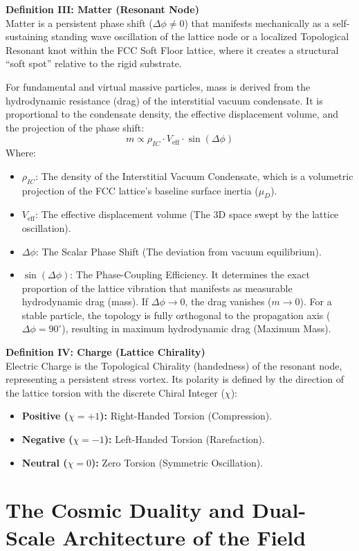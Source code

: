 \vspace{0.5em}
\noindent\textbf{Definition III: Matter (Resonant Node)}\\
Matter is a persistent phase shift ($\Delta\phi \neq 0$) that manifests mechanically as a self-sustaining standing wave oscillation of the lattice node or a localized Topological Resonant knot within the FCC Soft Floor lattice, where it creates a structural ``soft spot'' relative to the rigid substrate.

For fundamental and virtual massive particles, mass is derived from the hydrodynamic resistance (drag) of the interstitial vacuum condensate. It is proportional to the condensate density, the effective displacement volume, and the projection of the phase shift:
\begin{equation}
    m \propto \rho_{IC} \cdot V_{\text{eff}} \cdot \sin(\Delta\phi)
\end{equation}
Where:
\begin{itemize}
    \item $\rho_{IC}$: The density of the Interstitial Vacuum Condensate, which is a volumetric projection of the FCC lattice's baseline surface inertia ($\mu_D$).
    \item $V_{\text{eff}}$: The effective displacement volume (The 3D space swept by the lattice oscillation).
    \item $\Delta\phi$: The Scalar Phase Shift (The deviation from vacuum equilibrium).
    \item $\sin(\Delta\phi)$: The Phase-Coupling Efficiency. It determines the exact proportion of the lattice vibration that manifests as measurable hydrodynamic drag (mass). If $\Delta\phi \to 0$, the drag vanishes ($m \to 0$). For a stable particle, the topology is fully orthogonal to the propagation axis ($\Delta\phi = 90^\circ$), resulting in maximum hydrodynamic drag (Maximum Mass).
\end{itemize}

\vspace{0.5em}
\noindent\textbf{Definition IV: Charge (Lattice Chirality)}\\
Electric Charge is the Topological Chirality (handedness) of the resonant node, representing a persistent stress vortex. Its polarity is defined by the direction of the lattice torsion with the discrete Chiral Integer ($\chi$):
\begin{itemize}
    \item \textbf{Positive ($\chi = +1$):} Right-Handed Torsion (Compression).
    \item \textbf{Negative ($\chi = -1$):} Left-Handed Torsion (Rarefaction).
    \item \textbf{Neutral ($\chi = 0$):} Zero Torsion (Symmetric Oscillation).
\end{itemize}\chapter{The Cosmic Duality and Dual-Scale Architecture of the Field}


